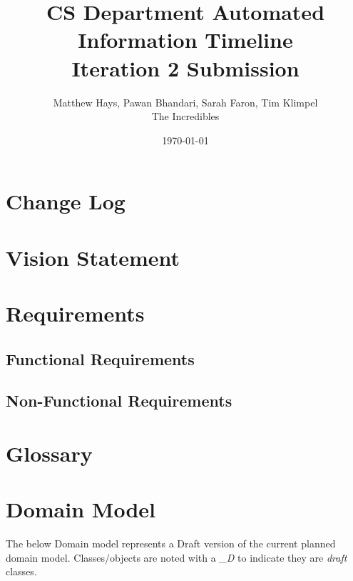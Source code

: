\documentclass{article}
\title{CS Department Automated Information Timeline \\ Iteration 2 Submission}
\date{\today}
\author{Matthew Hays, Pawan Bhandari, Sarah Faron, Tim Klimpel \\ The Incredibles}
\begin{document}
\maketitle
\newpage
\tableofcontents
\listoffigures
\newpage
\section{Change Log}


\section{Vision Statement}


\section{Requirements}
\subsection{Functional Requirements}


\subsection{Non-Functional Requirements}


\section{Glossary} \label{sec:Glossary}


\section{Domain Model}

The below Domain model represents a Draft version of the current planned domain model.  Classes/objects are noted with a \textit{\_D} to indicate they are \textit{draft} classes.
\end{document}
